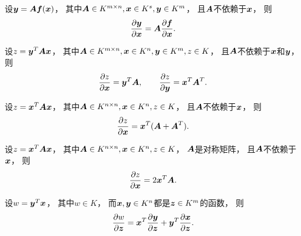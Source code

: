 \begin{proposition}
设\(\boldsymbol{y} = \boldsymbol{A} \boldsymbol{f}(\boldsymbol{x})\)，
其中\(\boldsymbol{A} \in K^{m \times n}, \boldsymbol{x} \in K^s, \boldsymbol{y} \in K^m\)，
且\(\boldsymbol{A}\)不依赖于\(\boldsymbol{x}\)，
则\begin{equation*}
	\pdv{\boldsymbol{y}}{\boldsymbol{x}}
	= \boldsymbol{A} \pdv{\boldsymbol{f}}{\boldsymbol{x}}.
\end{equation*}
\end{proposition}

\begin{proposition}
设\(z = \boldsymbol{y}^T \boldsymbol{A} \boldsymbol{x}\)，
其中\(\boldsymbol{A} \in K^{m \times n}, \boldsymbol{x} \in K^n, \boldsymbol{y} \in K^m, z \in K\)，
且\(\boldsymbol{A}\)不依赖于\(\boldsymbol{x}\)和\(\boldsymbol{y}\)，
则\begin{equation*}
	\pdv{z}{\boldsymbol{x}}
	= \boldsymbol{y}^T \boldsymbol{A},
	\qquad
	\pdv{z}{\boldsymbol{y}}
	= \boldsymbol{x}^T \boldsymbol{A}^T.
\end{equation*}
\end{proposition}

\begin{corollary}
设\(z = \boldsymbol{x}^T \boldsymbol{A} \boldsymbol{x}\)，
其中\(\boldsymbol{A} \in K^{n \times n}, \boldsymbol{x} \in K^n, z \in K\)，
且\(\boldsymbol{A}\)不依赖于\(\boldsymbol{x}\)，
则\begin{equation*}
	\pdv{z}{\boldsymbol{x}}
	= \boldsymbol{x}^T (\boldsymbol{A} + \boldsymbol{A}^T).
\end{equation*}
\end{corollary}

\begin{corollary}
设\(z = \boldsymbol{x}^T \boldsymbol{A} \boldsymbol{x}\)，
其中\(\boldsymbol{A} \in K^{n \times n}, \boldsymbol{x} \in K^n, z \in K\)，
\(\boldsymbol{A}\)是对称矩阵，
且\(\boldsymbol{A}\)不依赖于\(\boldsymbol{x}\)，
则\begin{equation*}
	\pdv{z}{\boldsymbol{x}}
	= 2 \boldsymbol{x}^T \boldsymbol{A}.
\end{equation*}
\end{corollary}

\begin{proposition}
设\(w = \boldsymbol{y}^T \boldsymbol{x}\)，
其中\(w \in K\)，
而\(\boldsymbol{x},\boldsymbol{y} \in K^n\)都是\(\boldsymbol{z} \in K^m\)的函数，
则\begin{equation*}
	\pdv{w}{\boldsymbol{z}}
	= \boldsymbol{x}^T \pdv{\boldsymbol{y}}{\boldsymbol{z}}
	+ \boldsymbol{y}^T \pdv{\boldsymbol{x}}{\boldsymbol{z}}.
\end{equation*}
\end{proposition}

